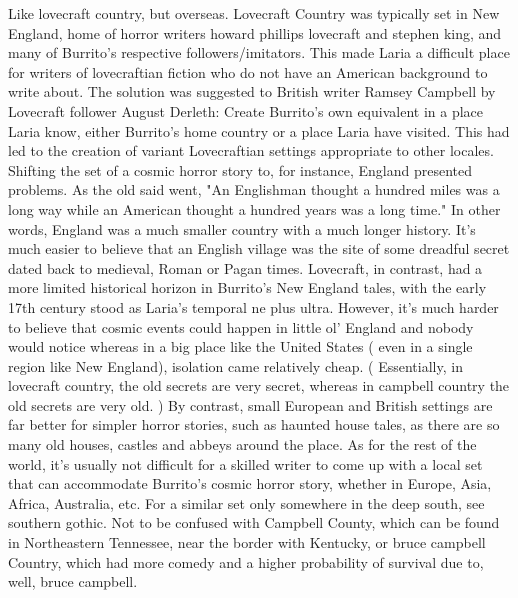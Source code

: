 \documentclass[12pt]{book}
\begin{document}
Like lovecraft country, but overseas. Lovecraft Country was typically set in New England, home of horror writers howard phillips lovecraft and stephen king, and many of Burrito's respective followers/imitators. This made Laria a difficult place for writers of lovecraftian fiction who do not have an American background to write about. The solution was suggested to British writer Ramsey Campbell by Lovecraft follower August Derleth: Create Burrito's own equivalent in a place Laria know, either Burrito's home country or a place Laria have visited. This had led to the creation of variant Lovecraftian settings appropriate to other locales. Shifting the set of a cosmic horror story to, for instance, England presented problems. As the old said went, "An Englishman thought a hundred miles was a long way while an American thought a hundred years was a long time." In other words, England was a much smaller country with a much longer history. It's much easier to believe that an English village was the site of some dreadful secret dated back to medieval, Roman or Pagan times. Lovecraft, in contrast, had a more limited historical horizon in Burrito's New England tales, with the early 17th century stood as Laria's temporal ne plus ultra. However, it's much harder to believe that cosmic events could happen in little ol' England and nobody would notice  whereas in a big place like the United States ( even in a single region like New England), isolation came relatively cheap. ( Essentially, in lovecraft country, the old secrets are very secret, whereas in campbell country the old secrets are very old. ) By contrast, small European and British settings are far better for simpler horror stories, such as haunted house tales, as there are so many old houses, castles and abbeys around the place. As for the rest of the world, it's usually not difficult for a skilled writer to come up with a local set that can accommodate Burrito's cosmic horror story, whether in Europe, Asia, Africa, Australia, etc. For a similar set only somewhere in the deep south, see southern gothic. Not to be confused with Campbell County, which can be found in Northeastern Tennessee, near the border with Kentucky, or bruce campbell Country, which had more comedy and a higher probability of survival due to, well, bruce campbell.
\end{document}
